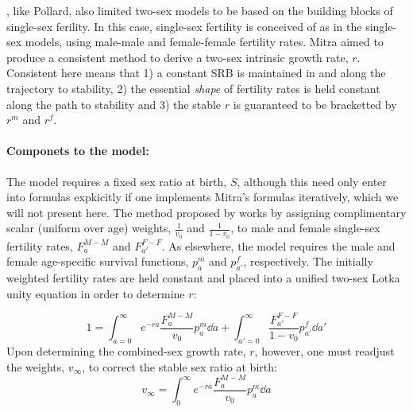 \citet{mitra1978derivation}, like Pollard, also limited two-sex models to be
based on the building blocks of single-sex ferility. In this case, single-sex fertility is
conceived of as in the single-sex models, using male-male and female-female
fertility rates. Mitra aimed to produce a consistent
method to derive a two-sex intrinsic growth rate, $r$. Consistent here means 
that 1) a constant SRB is maintained in and along the trajectory to stability, 2) 
the essential \textit{shape} of fertility rates is held constant along the path 
to stability and 3) the stable $r$ is guaranteed to be bracketted by $r^m$ and $r^f$.

\paragraph{Componets to the model: }
The model requires a fixed sex ratio at birth, $S$, although this need only
enter into formulas expkicitly if one implements Mitra's formulas iteratively,
which we will not present here. The method proposed by \citet{mitra1978derivation} works
by assigning complimentary scalar (uniform over age) weights, $\frac{1}{v_0}$ 
and $\frac{1}{1 - v_0}$, to male and female single-sex fertility rates, $F_a
^{M-M}$ and $F_{a'} ^{F-F}$. As elsewhere, the model requires the male
and female age-specific survival functions, $p_a^m$ and
$p_{a'}^f$, respectively. The initially weighted fertility rates are held
constant and placed into a unified two-sex Lotka unity equation in order to
determine $r$:

\begin{equation}
\label{eq:mitralotka}
1 = \int _{a=0} ^\infty e^{-r a} \frac{F_a ^{M-M}}{v_0} p_a^m \dd a + \int
_{a'=0} ^\infty \frac{F_{a'} ^{F-F}}{1 - v_0} p_{a'}^f \dd a'
\end{equation}
Upon determining the combined-sex growth rate, $r$, however, one must readjust
the weights, $v_\infty$, to correct the stable sex ratio at birth:
\begin{equation}
\label{eq:mitrastablev}
v_\infty = \int _0^\infty e^{-ra} \frac{F_a ^{M-M}}{v_0} p_a^m \dd a
\end{equation}

